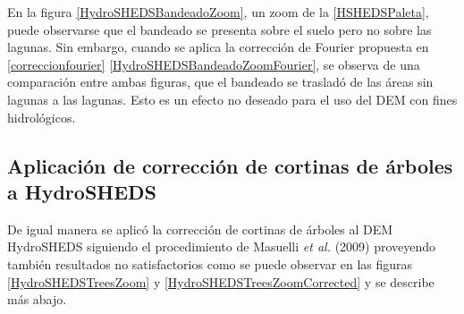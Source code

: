 \documentclass[10pt,a4paper, twoside]{report}
\begin{document}
En la figura \ref{HydroSHEDSBandeadoZoom}, un zoom de la \ref{HSHEDSPaleta}, puede observarse que el bandeado se presenta sobre el suelo pero no sobre las lagunas. Sin embargo, cuando se aplica la corrección de Fourier propuesta en \ref{correccionfourier} \ref{HydroSHEDSBandeadoZoomFourier}, se observa de una comparación entre ambas figuras, que el bandeado se trasladó de las áreas sin lagunas a las lagunas. Esto es un efecto no deseado para el uso del DEM con fines hidrológicos.

\subsection{Aplicación de corrección de cortinas de árboles a HydroSHEDS}

De igual manera se aplicó la corrección de cortinas de árboles al DEM HydroSHEDS siguiendo el procedimiento de Masuelli \textit{et al.} (2009) proveyendo también resultados no satisfactorios como se puede observar en las figuras \ref{HydroSHEDSTreesZoom} y \ref{HydroSHEDSTreesZoomCorrected} y se describe más abajo.
\end{document}
